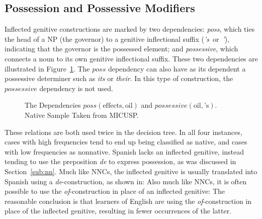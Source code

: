 \documentclass[main.tex]{subfiles}
\begin{document}
\subsection{Possession and Possessive Modifiers}

Inflected genitive constructions are marked by two dependencies: \textit{poss}, which ties the head of a NP (the governor) to a genitive inflectional suffix (\textit{'s}~or~\textit{'}), indicating that the governor is the possessed element; and \textit{possessive}, which connects a noun to its own genitive inflectional suffix. These two dependencies are illustrated in Figure~\ref{fig:poss-deps}. The $poss$ dependency can also have as its dependent a possessive determiner such as \textit{its} or \textit{their}. In this type of construction, the $possessive$ dependency is not used. 

\begin{figure}[htbp]
\centering
{}
\caption[The Dependencies $poss(\text{effects}, \text{oil})$ and $possessive(\text{oil}, \text{'s})$]{The Dependencies $poss(\text{effects}, \text{oil})$ and $possessive(\text{oil}, \text{'s})$. Native Sample Taken from MICUSP.}
\label{fig:poss-deps}
\end{figure}

These relations are both used twice in the decision tree. In all four instances, cases with high frequencies tend to end up being classified as native, and cases with low frequencies as nonnative. Spanish lacks an inflected genitive, instead tending to use the preposition \textit{de} to express possession, as was discussed in Section~\ref{sub:nn}. Much like NNCs, the inflected genitive is usually translated into Spanish using a \textit{de}-construction, as shown in:
Also much like NNCs, it is often possible to use the \textit{of}-construction in place of an inflected genitive:
The reasonable conclusion is that learners of English are using the \textit{of}-construction in place of the inflected genitive, resulting in fewer occurrences of the latter.
\end{document}
